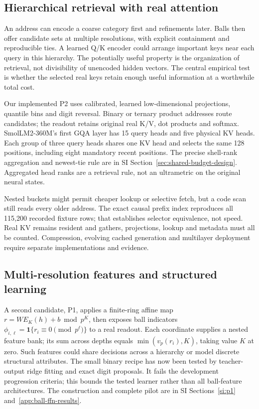 \documentclass[11pt]{article}
\newcommand{\ind}{\mathbf{1}}
\newcommand{\vp}{v_p}
\begin{document}
\subsection{Hierarchical retrieval with real attention}

An address can encode a coarse category first and refinements later. Balls
then offer candidate sets at multiple resolutions, with explicit containment
and reproducible ties. A learned Q/K encoder could arrange important keys
near each query in this hierarchy. The potentially useful property is the
organization of retrieval, not divisibility of unencoded hidden vectors.
The central empirical test is whether the selected real keys retain enough
useful information at a worthwhile total cost.

Our implemented P2 uses calibrated, learned low-dimensional projections,
quantile bins and digit reversal. Binary or ternary product addresses route
candidates; the readout retains original real K/V, dot products and softmax.
SmolLM2-360M's first GQA layer has 15 query heads and five physical KV heads.
Each group of three query heads shares one KV head and selects the same
128 positions, including eight
mandatory recent positions. The precise shell-rank aggregation and newest-tie
rule are in SI Section~\ref{sec:shared-budget-design}. Aggregated head ranks
are a retrieval rule, not an ultrametric on the original neural states.

Nested buckets might permit cheaper lookup or selective fetch, but a code
scan still reads every older address. The exact causal prefix index reproduces
all 115,200 recorded fixture rows; that establishes selector equivalence,
not speed. Real KV remains resident and gathers, projections, lookup and
metadata must all be counted. Compression, evolving cached generation and
multilayer deployment require separate implementations and evidence.

\subsection{Multi-resolution features and structured learning}

A second candidate, P1, applies a finite-ring affine map
\(r=WE_K(h)+b\bmod p^K\), then exposes ball indicators
\(\phi_{i,\ell}=\ind\{r_i\equiv0\pmod{p^\ell}\}\) to a real readout.
Each coordinate supplies a nested feature bank; its sum across depths equals
\(\min(\vp(r_i),K)\), taking value \(K\) at zero. Such features could
share decisions across a hierarchy or model discrete structural attributes.
The small binary recipe has now been tested by teacher-output ridge fitting
and exact digit proposals. It fails the development progression criteria;
this bounds the tested learner rather than all ball-feature architectures.
The construction and complete pilot are in SI Sections~\ref{si:p1}
and~\ref{app:ball-ffn-results}.
\end{document}
